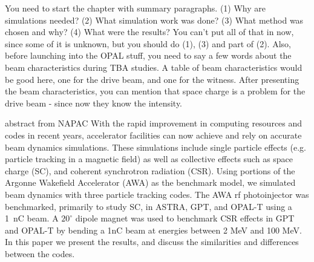 \documentclass{iitthesis}
\newcommand{\lsnote}[1]{\textsf{{\color{violet}{ LS note:}   #1 }}}
\newcommand{\nrnote}[1]{\textsf{{\color{blue}{ NN note:}   #1 }}}
\begin{document}




\label{sec:code}

\lsnote{You need to start the chapter with summary paragraphs.  (1) Why are simulations needed?  (2) What simulation work was done?  (3) What method was chosen and why?  (4) What were the results?  You can't put  all of that in now, since some of it is unknown, but you should do (1), (3) and part of (2).  Also, before launching into the OPAL stuff, you need to say a few words about the beam characteristics during TBA studies.  A table of beam characteristics would be good here, one for the drive beam, and one for the witness.  After presenting the beam characteristics, you can mention that space charge is a problem for the drive beam - since now they know the intensity.}


\nrnote{abstract from NAPAC}
With  the  rapid  improvement  in  computing  resources  and  codes  in  recent  years,  
accelerator  facilities  can  now achieve and rely on accurate beam dynamics simulations. 
These  simulations  include  single  particle  effects  (e.g. particle tracking in a magnetic field) as well as collective effects  such  as  space  charge  (SC),  and  coherent  synchrotron  radiation  (CSR).
Using portions of the Argonne Wakefield  Accelerator (AWA) as the benchmark model,  
we simulated beam dynamics with three particle tracking codes.
The AWA rf photoinjector was benchmarked, primarily to study SC, 
in ASTRA, GPT, and OPAL-T using a \SI{1}{nC} beam. 
A $20^{\circ}$ dipole magnet was used to benchmark 
CSR effects in GPT and OPAL-T by bending a 1nC beam 
at  energies  between  2  MeV  and  100  MeV.  In  this  paper  
we  present  the  results,  and  discuss  the  similarities  and  
differences between the codes.
\end{document}

